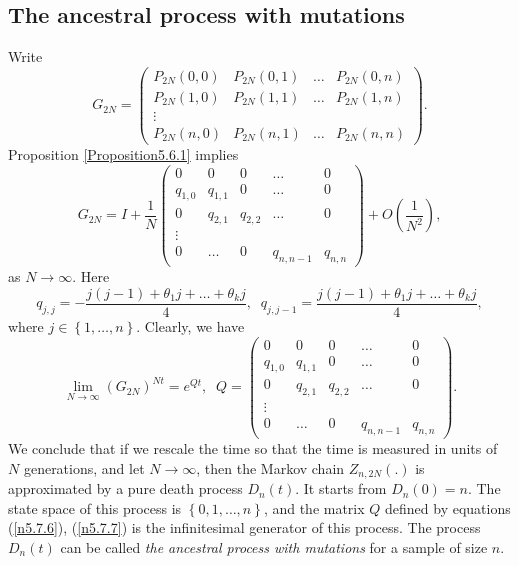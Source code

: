 \documentclass[12pt]{amsart}
\theoremstyle{definition}
\numberwithin{equation}{section}
\begin{document}
\subsection{The ancestral process with mutations}\label{SectionAncestral}
Write
\begin{equation}\label{n5.7.4}
G_{2N}=\left(\begin{array}{cccc}
  P_{2N}(0,0) & P_{2N}(0,1) & \ldots & P_{2N}(0,n) \\
  P_{2N}(1,0) & P_{2N}(1,1) & \ldots & P_{2N}(1,n) \\
  \vdots &  &  &  \\
  P_{2N}(n,0) & P_{2N}(n,1) & \ldots & P_{2N}(n,n)
\end{array}
\right).
\end{equation}
Proposition \ref{Proposition5.6.1} implies
\begin{equation}\label{n5.7.5}
G_{2N}=I+\frac{1}{N}\left(\begin{array}{ccccc}
  0 & 0 & 0 &\ldots & 0 \\
  q_{1,0} & q_{1,1} &  0 & \ldots & 0 \\
  0 & q_{2,1} & q_{2,2} &\ldots & 0\\
  \vdots &  & &  &  \\
  0 & \ldots & 0 & q_{n,n-1} & q_{n,n}
\end{array}
\right)+O\left(\frac{1}{N^2}\right),
\end{equation}
as $N\longrightarrow\infty$. Here
\begin{equation}\label{n5.7.6}
q_{j,j}=-\frac{j(j-1)+\theta_1j+\ldots +\theta_k j}{4},\;\;
q_{j,j-1}=\frac{j(j-1)+\theta_1j+\ldots +\theta_k j}{4},
\end{equation}
where $j\in\left\{1,\ldots,n\right\}$.
Clearly, we have
\begin{equation}\label{n5.7.7}
\underset{N\rightarrow\infty}{\lim}\left(G_{2N}\right)^{Nt}
=e^{Qt},\;\;
Q=\left(\begin{array}{ccccc}
  0 & 0 & 0 &\ldots & 0 \\
  q_{1,0} & q_{1,1} &  0 & \ldots & 0 \\
  0 & q_{2,1} & q_{2,2} &\ldots & 0\\
  \vdots &  & &  &  \\
  0 & \ldots & 0 & q_{n,n-1} & q_{n,n}
\end{array}
\right).
\end{equation}
We conclude that if we rescale the time so that the time is measured
in units of $N$ generations, and let $N\longrightarrow\infty$,
then the Markov chain $Z_{n,2N}(.)$ is approximated by a pure death process $D_n(t)$. It starts from $D_n(0)=n$.
The state space of this process is $\left\{0,1,\ldots,n\right\}$, and the matrix $Q$ defined by
equations (\ref{n5.7.6}), (\ref{n5.7.7}) is the infinitesimal
generator of this process. The process $D_n(t)$ can be called
\textit{the ancestral process with mutations} for a sample of size $n$.
\end{document}
